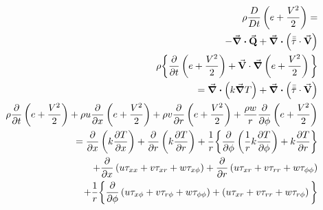 \begin{equation}
  \begin{aligned}
\rho\frac{D}{Dt}\left(e + \frac{V^2}{2}\right) = \\
- \div{\va{Q}} + \div\left(\bar{\bar{\tau}}\cdot\va{V}\right) \\
  \rho \bigg\{\pdv{t}\left(e + \frac{V^2}{2}\right)
  + \va{V}\cdot\grad\left(e + \frac{V^2}{2}\right)
  \bigg\} \\
  = \div{\left(k\grad{T}\right)}
  + \div{\left(\bar{\bar{\tau}}\cdot\va{V}\right)} \\
  \rho\pdv{t}\left(e + \frac{V^2}{2}\right) 
  + \rho u \pdv{x}\left(e + \frac{V^2}{2}\right)
  + \rho v \pdv{r}\left(e + \frac{V^2}{2}\right)
  + \frac{\rho w}{r}\pdv{\phi}\left(e + \frac{V^2}{2}\right) \\
  =\pdv{x}\left(k\pdv{T}{x}\right) + \pdv{r}\left(k\pdv{T}{r}\right) 
    + \frac{1}{r}\bigg\{\pdv{\phi}\left(\frac{1}{r}k\pdv{T}{\phi}\right) 
    + k\pdv{T}{r}\bigg\} \\
  + \pdv{x}\left(u\tau_{xx} + v\tau_{xr} + w\tau_{x\phi}\right)
  + \pdv{r}\left(u\tau_{xr} + v\tau_{rr} + w\tau_{\phi\phi}\right) \\
    + \frac{1}{r}\bigg\{\pdv{\phi}\left(u\tau_{x\phi}+v\tau_{r\phi}+w\tau_{\phi\phi}\right)
  + \left(u\tau_{xr} + v\tau_{rr} + w\tau_{r\phi}\right)\bigg\}
  \end{aligned} \\
\end{equation}
